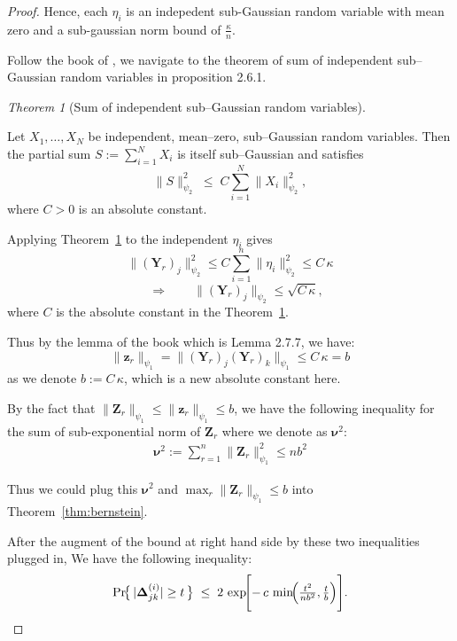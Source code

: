 \documentclass[11pt]{article}
\numberwithin{equation}{section}
\theoremstyle{plain}
\theoremstyle{definition}
\theoremstyle{remark}
\newtheorem{thm}[theorem]{Theorem}
\begin{document}
\begin{proof}
Hence, each \(\eta_{i}\) is an indepedent sub-Gaussian random variable with mean zero and a sub-gaussian norm bound of \(\frac{\kappa}{n}\).

Follow the book of \cite{vershynin2018high}, we navigate to the theorem of sum of independent sub–Gaussian random variables in proposition 2.6.1.

\begin{thm}[Sum of independent sub–Gaussian random variables]
  \label{thm:sug}

  Let \(X_{1},\dots ,X_{N}\) be independent, mean–zero, sub–Gaussian
  random variables.  Then the partial sum
  \(S:=\sum_{i=1}^{N}X_{i}\) is itself sub–Gaussian and satisfies
  \[
    \bigl\|S\bigr\|_{\psi_{2}}^{2}
       \;\le\;
       C\sum_{i=1}^{N}\bigl\|X_{i}\bigr\|_{\psi_{2}}^{2},
  \]
  where \(C>0\) is an absolute constant.
  \end{thm}


  Applying Theorem~\ref{thm:sug} to the independent \(\eta_{i}\) gives
  \[
    \|(\mathbf{Y}_{r})_{j}\|_{\psi_{2}}^{2}
       \le C \sum_{i=1}^{n}\|\eta_{i}\|_{\psi_{2}}^{2}
       \le C\,\kappa
  \]
  \[
    \quad\Longrightarrow\qquad
    \|(\mathbf{Y}_{r})_{j}\|_{\psi_{2}}\le\sqrt{C\,\kappa},
  \]
  where \(C\) is the absolute constant in the Theorem~\ref{thm:sug}.

Thus by the lemma of the book\cite{vershynin2018high} which is Lemma 2.7.7, we have:
\[
  \|\mathbf{z}_{r}\|_{\psi_{1}} = \|(\mathbf{Y}_{r})_{j}(\mathbf{Y}_{r})_{k}\|_{\psi_{1}} \leq C\,\kappa = b
\]
as we denote \( b := C\,\kappa \), which is a new absolute constant here.

By the fact that $\|\mathbf{Z}_{r}\|_{\psi_{1}} \leq \|\mathbf{z}_{r}\|_{\psi_{1}} \leq b$, we have
the following inequality for the sum of sub-exponential norm of \(\mathbf{Z}_{r}\) where we denote as \(\boldsymbol{\nu}^{2}\):
\begin{align*}
  \boldsymbol{\nu}^{2} := \sum_{r=1}^{n}\|\mathbf{Z}_{r}\|_{\psi_{1}}^{2}
  \leq n b^{2}
\end{align*}

Thus we could plug this $\boldsymbol\nu^{2}$ and $\max_{r}\|\mathbf{Z}_{r}\|_{\psi_{1}} \le b$ into Theorem~\ref{thm:bernstein}.

After the augment of the bound at right hand side by these two inequalities plugged in, We have the following inequality:
  \[
\Pr\!\bigl\{\,|\mathbf{\Delta}_{jk}^{(i)}|\ge t\,\bigr\}
   \;\le\;
   2\,\exp\!\Biggl[
     -\,c\,
     \min\!\Bigl(
       \tfrac{t^{2}}{n b^{2}},
       \tfrac{t}{b}
     \Bigr)
   \Biggr].
\]


\end{proof}
\end{document}
